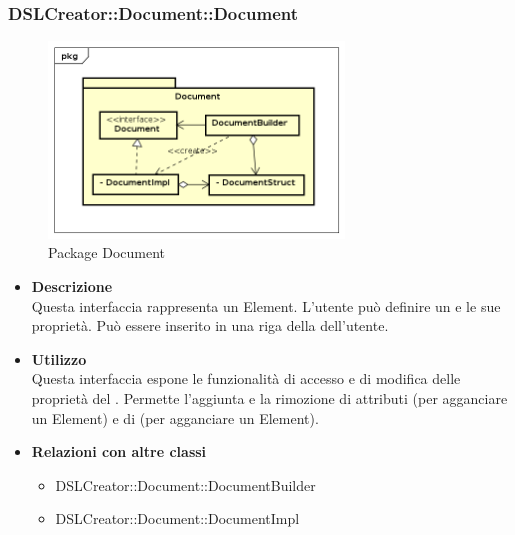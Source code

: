  \subsubsection{DSLCreator::Document::Document}
                \begin{figure}[H]
                  \centering
                  \includegraphics[width=0.7\textwidth]{res/img/Document.png}
                  \caption{Package Document}
                  \label{fig:diagram_model}
                \end{figure}
                    \begin{itemize}
                        \item \textbf{Descrizione} \hfill \\
                            Questa interfaccia rappresenta un  Element. L'utente può definire un  e le sue proprietà. Può essere inserito in una riga della  dell'utente.
                        \item \textbf{Utilizzo} \hfill \\
                            Questa interfaccia espone le funzionalità di accesso e di modifica delle proprietà del . Permette l'aggiunta e la rimozione di attributi  (per agganciare un  Element) e di  (per agganciare un  Element).
                        \item \textbf{Relazioni con altre classi}
                            \begin{itemize}
                              \item DSLCreator::Document::DocumentBuilder
                              \item DSLCreator::Document::DocumentImpl
                            \end{itemize}
                    \end{itemize}

